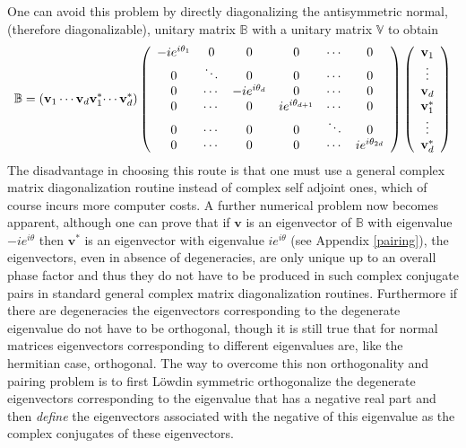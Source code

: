 \documentclass[aps,preprint]{revtex4}%
\begin{document}
One can avoid this problem by directly diagonalizing the antisymmetric normal,
(therefore diagonalizable), unitary matrix $\mathbb{B}$ with a unitary matrix
$\mathbb{V}$ to obtain
\begin{equation}
\mathbb{B}=\left(  \mathbf{v}_{1}\cdots\mathbf{v}_{d}\mathbf{v}_{1}^{\ast
}\mathbf{\cdots v}_{d}^{\ast}\right)  \left(
\begin{array}
[c]{cccccc}%
-ie^{i\theta_{1}} & 0 & 0 & 0 & \cdots & 0\\
0 & \ddots & 0 & 0 & \cdots & 0\\
0 & \cdots & -ie^{i\theta_{d}} & 0 & \cdots & 0\\
0 & \cdots & 0 & ie^{i\theta_{d+1}} & \cdots & 0\\
0 & \cdots & 0 & 0 & \ddots & 0\\
0 & \cdots & 0 & 0 & \cdots & ie^{i\theta_{2d}}%
\end{array}
\right)  \left(
\begin{array}
[c]{c}%
\mathbf{v}_{1}\\
\vdots\\
\mathbf{v}_{d}\\
\mathbf{v}_{1}^{\ast}\\
\vdots\\
\mathbf{v}_{d}^{\ast}%
\end{array}
\right)
\end{equation}
The disadvantage in choosing this route is that one must use a general complex
matrix diagonalization routine instead of complex self adjoint ones, which of
course incurs more computer costs. A further numerical problem now becomes
apparent, although one can prove that if $\mathbf{v}$ is an eigenvector of
$\mathbb{B}$ with eigenvalue $-ie^{i\theta}$ then $\mathbf{v}^{\ast}$ is an
eigenvector with eigenvalue $ie^{i\theta}$ (see Appendix \ref{pairing}), the
eigenvectors, even in absence of degeneracies, are only unique up to an
overall phase factor and thus they do not have to be produced in such complex
conjugate pairs in standard general complex matrix diagonalization routines.
Furthermore if there are degeneracies the eigenvectors corresponding to the
degenerate eigenvalue do not have to be orthogonal, though it is still true
that for normal matrices eigenvectors corresponding to different eigenvalues
are, like the hermitian case, orthogonal. The way to overcome this non
orthogonality and pairing problem is to first L\"{o}wdin symmetric
orthogonalize \cite{Lowdin2} the degenerate eigenvectors corresponding to the
eigenvalue that has a negative real part and then \emph{define }the
eigenvectors associated with the negative of this eigenvalue as the complex
conjugates of these eigenvectors.
\end{document}
